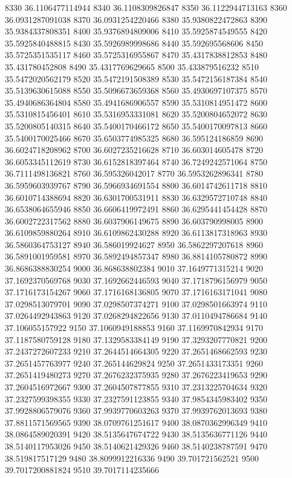 {8330 36.1106477114944
8340 36.1108309826847
8350 36.1122944713163
8360 36.0931287091038
8370 36.0931254220466
8380 35.9380822472863
8390 35.9384337808351
8400 35.9376894809006
8410 35.5925874549555
8420 35.5925840488815
8430 35.5926989998686
8440 35.592695568606
8450 35.5725351535117
8460 35.5725316955867
8470 35.4317838812853
8480 35.431780452808
8490 35.4317769629665
8500 35.433879516232
8510 35.5472020562179
8520 35.5472191508389
8530 35.5472156187384
8540 35.5139630615088
8550 35.5096673659368
8560 35.4930697107375
8570 35.4940686364804
8580 35.4941686906557
8590 35.5310814951472
8600 35.5310815456401
8610 35.5316953331081
8620 35.5200804652072
8630 35.5200805140315
8640 35.5400170466172
8650 35.5400170097813
8660 35.5400170025466
8670 35.6503774985325
8680 36.595124186859
8690 36.6024718208962
8700 36.6027235216628
8710 36.603014605478
8720 36.6053345112619
8730 36.6152818397464
8740 36.7249242571064
8750 36.7111498136821
8760 36.595326042017
8770 36.5953262896341
8780 36.5959603939767
8790 36.5966934691554
8800 36.6014742611718
8810 36.6010714388694
8820 36.6301700531911
8830 36.6329572710748
8840 36.6538064655946
8850 36.6606419972491
8860 36.6295441454428
8870 36.6002722317562
8880 36.6037906149675
8890 36.603790998005
8900 36.6109859880264
8910 36.6109862430288
8920 36.6113817318963
8930 36.5860364753127
8940 36.586019924627
8950 36.5862297207618
8960 36.5891001959581
8970 36.5892494857347
8980 36.8814105780872
8990 36.8686388830254
9000 36.868638802384
9010 37.1649771315214
9020 37.1692370569768
9030 37.1692662446593
9040 37.1718796156979
9050 37.1716173154267
9060 37.1716168136805
9070 37.1716163171041
9080 37.0298513079701
9090 37.0298507374271
9100 37.0298501663974
9110 37.0264492943863
9120 37.0268294822656
9130 37.0110494786684
9140 37.106055157922
9150 37.1060949188853
9160 37.1169970842934
9170 37.1187580759128
9180 37.1329583384149
9190 37.3293207770821
9200 37.2437272607233
9210 37.2644514664305
9220 37.2651468662593
9230 37.2651457763977
9240 37.265144629824
9250 37.2651433173351
9260 37.2651419480273
9270 37.2676232375935
9280 37.2676223419653
9290 37.2604516972667
9300 37.2604507877855
9310 37.2313225704634
9320 37.2327599398355
9330 37.2327591123855
9340 37.9854345983402
9350 37.9928806579076
9360 37.9939770603263
9370 37.9939762013693
9380 37.8811571569565
9390 38.0709761251617
9400 38.0870362996349
9410 38.0864589020391
9420 38.5135647674722
9430 38.5135636771126
9440 38.5140117953026
9450 38.5140621429326
9460 38.5140238787591
9470 38.519817517129
9480 38.8099912216336
9490 39.701721562521
9500 39.7017200881824
9510 39.7017114235666
}
